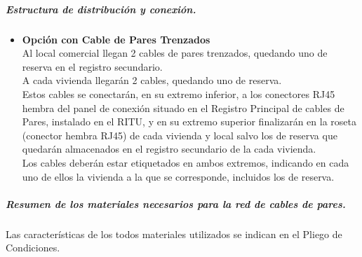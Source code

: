 \subparagraph{Estructura de distribución y conexión.}
\begin{itemize}
	\item \textbf{Opción con Cable de Pares Trenzados}\\
	Al local comercial llegan 2 cables de pares trenzados, quedando uno de reserva en el registro
secundario.\\
A cada vivienda llegarán 2 cables, quedando uno de reserva.\\
Estos cables se conectarán, en su extremo inferior, a los conectores RJ45 hembra del panel de
conexión situado en el Registro Principal de cables de Pares, instalado en el RITU, y en su
extremo superior finalizarán en la roseta (conector hembra RJ45) de cada vivienda y local salvo
los de reserva que quedarán almacenados en el registro secundario de la cada vivienda.\\
Los cables deberán estar etiquetados en ambos extremos, indicando en cada uno de ellos la
vivienda a la que se corresponde, incluidos los de reserva.
\end{itemize}

\subparagraph{Resumen de los materiales necesarios para la red de cables de pares.}
Las características de los todos materiales utilizados se indican en el Pliego de Condiciones.

